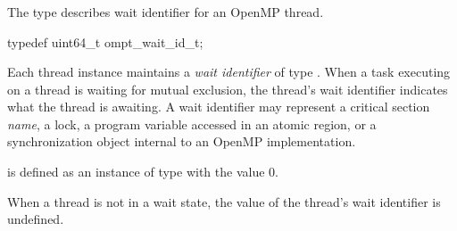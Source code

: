 \subsubsection{}
\label{sec:ompt_wait_id_t}

\summary
The  type describes wait identifier for an OpenMP thread.

\format
\begin{ccppspecific}
\begin{omptOther}
typedef uint64_t ompt_wait_id_t;
\end{omptOther}
\end{ccppspecific}

\descr

Each thread instance maintains a \emph{wait identifier} of type 
. When a task executing on a thread is waiting 
for mutual exclusion, the thread's wait identifier indicates what the 
thread is awaiting. A wait identifier may represent a critical section 
{\em name}, a lock, a program variable accessed in an atomic region, or 
a synchronization object internal to an OpenMP implementation.

 is defined as an instance of type 
 with the value 0.

When a thread is not in a wait state, the value of the thread's wait 
identifier is undefined.


